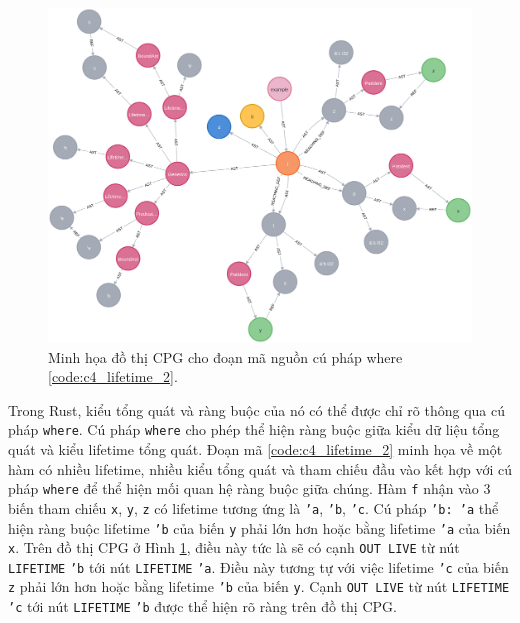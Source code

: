 \begin{figure}[H]
    \includegraphics[width=1\columnwidth]{figures/c4/c4_lifetime_2.png}
    \centering
    \caption{Minh họa đồ thị CPG cho đoạn mã nguồn cú pháp where \ref{code:c4_lifetime_2}.}
    \label{img:c4_lifetime_2}
\end{figure}

Trong Rust, kiểu tổng quát và ràng buộc của nó có thể được chỉ rõ thông qua cú pháp \texttt{where}.
Cú pháp \texttt{where} cho phép thể hiện ràng buộc giữa kiểu dữ liệu tổng quát và kiểu lifetime tổng quát.
Đoạn mã \ref{code:c4_lifetime_2} minh họa về một hàm có nhiều lifetime, nhiều kiểu tổng quát và tham chiếu đầu vào kết hợp với cú pháp \texttt{where} để thể hiện mối quan hệ ràng buộc giữa chúng.
Hàm \texttt{f} nhận vào 3 biến tham chiếu \texttt{x}, \texttt{y}, \texttt{z} có lifetime tương ứng là \texttt{'a}, \texttt{'b}, \texttt{'c}.
Cú pháp \texttt{'b: 'a} thể hiện ràng buộc lifetime \texttt{'b} của biến \texttt{y} phải lớn hơn hoặc bằng lifetime \texttt{'a} của biến \texttt{x}.
Trên đồ thị CPG ở Hình \ref{img:c4_lifetime_2}, điều này tức là sẽ có cạnh \texttt{OUT LIVE} từ nút \texttt{LIFETIME} \texttt{'b} tới nút \texttt{LIFETIME} \texttt{'a}.
Điều này tương tự với việc lifetime \texttt{'c} của biến \texttt{z} phải lớn hơn hoặc bằng lifetime \texttt{'b} của biến \texttt{y}.
Cạnh \texttt{OUT LIVE} từ nút \texttt{LIFETIME} \texttt{'c} tới nút \texttt{LIFETIME} \texttt{'b} được thể hiện rõ ràng trên đồ thị CPG.

